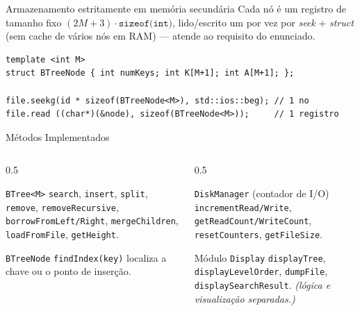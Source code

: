 \documentclass[aspectratio=169,11pt]{beamer}
\begin{document}
\begin{frame}[fragile]{Armazenamento estritamente em memória secundária}
  Cada nó é um registro de \alert{tamanho fixo} $(2M+3)\cdot\texttt{sizeof(int)}$,
  lido/escrito \alert{um por vez} por \emph{seek} + \emph{struct} (sem cache de
  vários nós em RAM) --- atende ao requisito do enunciado.
  \begin{lstlisting}
template <int M>
struct BTreeNode { int numKeys; int K[M+1]; int A[M+1]; };

file.seekg(id * sizeof(BTreeNode<M>), std::ios::beg); // 1 no
file.read ((char*)(&node), sizeof(BTreeNode<M>));     // 1 registro
  \end{lstlisting}
\end{frame}

\begin{frame}{Métodos Implementados}
  \begin{columns}[T,onlytextwidth]
    \begin{column}{0.5\textwidth}
      \begin{block}{\texttt{BTree<M>}}
        \footnotesize
        \texttt{search}, \texttt{insert}, \texttt{split}, \texttt{remove},
        \texttt{removeRecursive}, \texttt{borrowFromLeft/Right},
        \texttt{mergeChildren}, \texttt{loadFromFile}, \texttt{getHeight}.
      \end{block}
      \begin{block}{\texttt{BTreeNode}}
        \footnotesize
        \texttt{findIndex(key)} localiza a chave ou o ponto de inserção.
      \end{block}
    \end{column}
    \begin{column}{0.5\textwidth}
      \begin{block}{\texttt{DiskManager} (contador de I/O)}
        \footnotesize
        \texttt{incrementRead/Write}, \texttt{getReadCount/WriteCount},
        \texttt{resetCounters}, \texttt{getFileSize}.
      \end{block}
      \begin{block}{Módulo \texttt{Display}}
        \footnotesize
        \texttt{displayTree}, \texttt{displayLevelOrder}, \texttt{dumpFile},
        \texttt{displaySearchResult}. \emph{(lógica e visualização separadas.)}
      \end{block}
    \end{column}
  \end{columns}
\end{frame}
\end{document}
